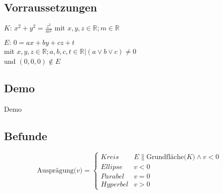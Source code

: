 \subsection{Vorraussetzungen}
\begin{frame}
\begin{definition}
	$\text{$K$: }x^2+y^2=\frac{z^2}{m^2} \text{ mit } x,y,z\in \mathbb{R};m\in \mathbb{R}$
\end{definition}
\end{frame}

\begin{frame}
\begin{definition}
	$\text{$E$: }0=ax+by+cz+t$ \\
	mit $x,y,z\in \mathbb{R}; a,b,c,t\in \mathbb{R}|(a \lor b \lor c) \neq 0$\\
	und $(0,0,0) \notin E$
\end{definition}
\end{frame}

\subsection{Demo}
\begin{frame}
\centerline{\huge Demo}
\end{frame}

\subsection{Befunde}
\begin{frame}
\begin{displaymath}
   \text{Ausprägung($v$)} = \left\{
     \begin{array}{lr}
       Kreis & E \parallel \text{Grundfläche($K$)} \wedge v < 0 \\
       Ellipse & v < 0\\
       Parabel & v = 0\\
       Hyperbel & v > 0
     \end{array}
   \right.
\end{displaymath}
\end{frame}